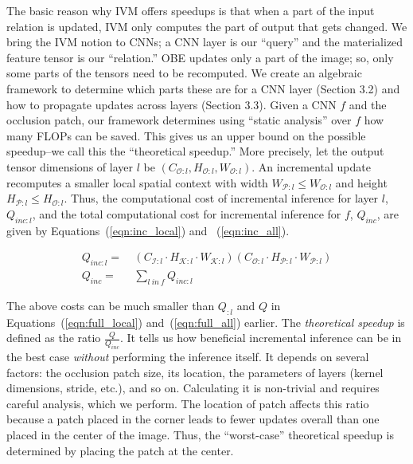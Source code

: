 The basic reason why IVM offers speedups is that when a part of the input relation is updated, IVM only computes the part of output that gets changed. We bring the IVM notion to CNNs; a CNN layer is our ``query'' and the materialized feature tensor is our ``relation.'' OBE updates only a part of the image; so, only some parts of the tensors need to be recomputed. We create an algebraic framework to determine which parts these are for a CNN layer (Section 3.2) and how to propagate updates across layers (Section 3.3). Given a CNN $f$ and the occlusion patch, our framework determines using ``static analysis'' over $f$ how many FLOPs can be saved. This gives us an upper bound on the possible speedup--we call this the ``theoretical speedup.''
%
More precisely, let the output tensor dimensions of layer $l$ be $(C_{\mathcal{O}:l} , H_{\mathcal{O}:l} , W_{\mathcal{O}:l})$. An incremental update recomputes a smaller local spatial context with width $W_{\mathcal{P}:l} \le W_{\mathcal{O}:l}$ and height $H_{\mathcal{P}:l} \le H_{\mathcal{O}:l}$. Thus, the computational cost of incremental inference for layer $l$, $Q_{inc:l}$, and the total computational cost for incremental inference for $f$, $Q_{inc}$, are given by Equations~(\ref{eqn:inc_local}) and ~(\ref{eqn:inc_all}).

\vspace{-2mm}
\begin{align}
\label{eqn:inc_local}
Q_{inc:l} =&~ (C_{\mathcal{I}:l} \cdot H_{\mathcal{K}:l} \cdot W_{\mathcal{K}:l})  (C_{\mathcal{O}:l} \cdot H_{\mathcal{P}:l} \cdot W_{\mathcal{P}:l})\\
\label{eqn:inc_all}
Q_{inc} =&~ \sum_{l~\mathit{in}~f} Q_{inc:l}
\end{align}

The above costs can be much smaller than $Q_{:l}$ and $Q$ in Equations~(\ref{eqn:full_local}) and~(\ref{eqn:full_all}) earlier.
The \textit{theoretical speedup} is defined as the ratio $\frac{Q}{Q_{inc}}$. It tells us how beneficial incremental inference can be in the best case \textit{without} performing the inference itself. It depends on several factors: the occlusion patch size, its location, the parameters of layers (kernel dimensions, stride, etc.), and so on. Calculating it is non-trivial and requires careful analysis, which we perform. The location of patch affects this ratio because a patch placed in the corner leads to fewer updates overall than one placed in the center of the image. Thus, the ``worst-case'' theoretical speedup is determined by placing the patch at the center.

